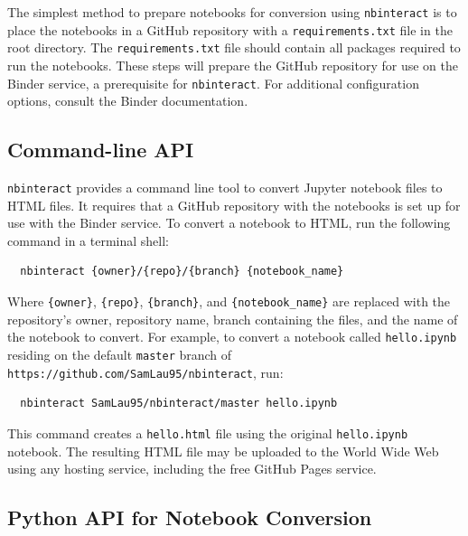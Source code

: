 \documentclass[nobib]{tufte-handout}
\newcommand{\code}[1]{\texttt{#1}}
\begin{document}
The simplest method to prepare notebooks for conversion using \code{nbinteract}
is to place the notebooks in a GitHub repository with a \code{requirements.txt}
file in the root directory. The \code{requirements.txt} file should contain all
packages required to run the notebooks. These steps will prepare the GitHub
repository for use on the Binder service, a prerequisite for \code{nbinteract}.
For additional configuration options, consult the Binder
documentation.


\subsection{Command-line API} %
\label{sub:command_line_api}

\code{nbinteract} provides a command line tool to convert Jupyter notebook
files to HTML files. It requires that a GitHub repository with the notebooks is
set up for use with the Binder service. To convert a notebook to HTML, run the
following command in a terminal shell:

\begin{verbatim}
  nbinteract {owner}/{repo}/{branch} {notebook_name}
\end{verbatim}

Where \code{\{owner\}}, \code{\{repo\}}, \code{\{branch\}}, and
\verb|{notebook_name}| are replaced with the repository's owner, repository
name, branch containing the files, and the name of the notebook to convert. For
example, to convert a notebook called \code{hello.ipynb} residing on the
default \code{master} branch of \code{https://github.com/SamLau95/nbinteract},
run:

\begin{verbatim}
  nbinteract SamLau95/nbinteract/master hello.ipynb
\end{verbatim}

This command creates a \code{hello.html} file using the original
\code{hello.ipynb} notebook. The resulting HTML file may be
uploaded to the World Wide Web using any hosting service, including the free
GitHub Pages service.


\subsection{Python API for Notebook Conversion} %
\label{sub:python_api}
\end{document}
